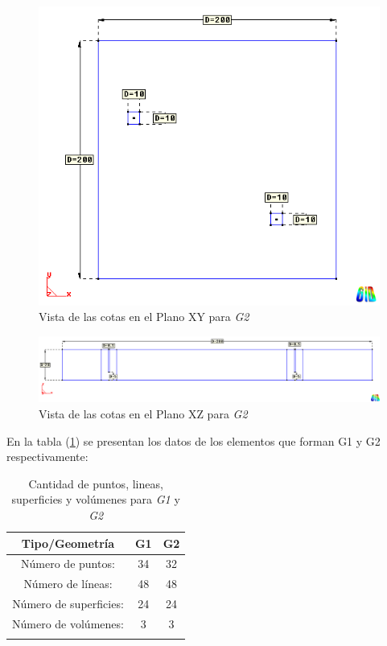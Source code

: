 \documentclass[10pt,a4paper,final]{article}
\begin{document}
%
%
\begin{figure}[tbhp]
\centerline{\includegraphics[scale=0.4]{img/200m/200_xy_cotas}}
\caption{Vista de las cotas en el Plano XY para \emph{G2}}
\label{200_xy_cotas}
\end{figure}
%
\begin{figure}[tbhp]
\centerline{\includegraphics[scale=0.4]{img/200m/200_xz_cotas}}
\caption{Vista de las cotas en el Plano XZ para \emph{G2}}
\label{200_xz_cotas}
\end{figure}
%
En la tabla (\ref{tabla_lista_entidades}) se presentan los datos de los elementos que forman G1 y G2 respectivamente:
%
\begin{table}[tbhp]
\begin{center}\begin{tabular}{ccc}
\hline \textbf{Tipo/Geometría} & \textbf{G1} & \textbf{G2} \\ 
\hline Número de puntos: & 34 & 32 \\ 
\hline Número de líneas: & 48 & 48 \\ 
\hline Número de superficies: & 24 & 24 \\ 
\hline Número de volúmenes: & 3 & 3 \\ 
\hline 
\label{tabla_lista_entidades}
\end{tabular}\end{center}
\caption{Cantidad de puntos, lineas, superficies y volúmenes para \emph{G1} y \emph{G2}}
\end{table}
%
%
\end{document}
